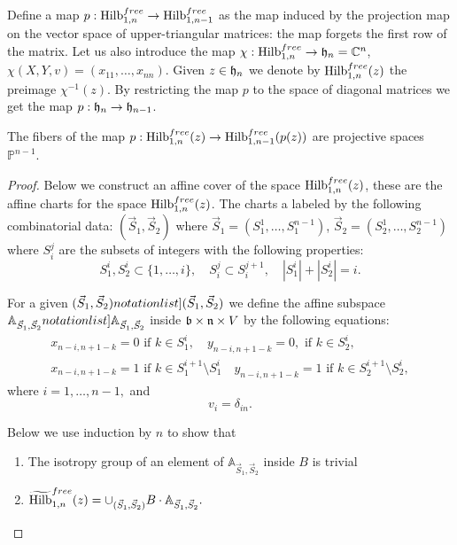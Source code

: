 \documentclass[10pt]{amsart}
\begin{document}
Define a map $p: \mathrm{Hilb}^{free}_{1,n}\to \mathrm{Hilb}^{free}_{1,n-1}$ as the map induced by the projection map on the vector space of upper-triangular matrices: the map
forgets the first row of the matrix. Let us also introduce the map $\chi: \mathrm{Hilb}^{free}_{1,n}\to \mathfrak{h}_n=\mathbb{C}^{n}$, $\chi(X,Y,v)=(x_{11},\dots,x_{nn})$.  Given $z\in \mathfrak{h}_n$ we denote by $\mathrm{Hilb}^{free}_{1,n}(z)$ the preimage
$\chi^{-1}(z)$. By restricting the map $p$ to the space of diagonal matrices we get the map $p:\mathfrak{h}_n\to \mathfrak{h}_{n-1}$.

\begin{proposition}\label{prop: aff cover} The fibers of the map $p: \mathrm{Hilb}^{free}_{1,n}(z)\to \mathrm{Hilb}^{free}_{1,n-1}(p(z))$ are projective spaces $\mathbb{P}^{n-1}$.
\end{proposition}
\begin{proof}
Below we construct an affine cover of the space $\mathrm{Hilb}^{free}_{1,n}(z)$, these are the affine charts for the space $\mathrm{Hilb}^{free}_{1,n}(z)$. The charts a labeled by the following combinatorial data: $(\vec{S}_1,\vec{S}_2)$
where $\vec{S}_1=(S_1^1,\dots,S_1^{n-1})$, $\vec{S}_2=(S_2^1,\dots, S_2^{n-1})$ where $S_i^j$ are the subsets of integers with the following properties:
$$ S_1^i, S_2^i\subset \{1,\dots,i\},\quad S_i^j\subset S_i^{j+1},\quad |S_1^i|+|S_2^i|=i.$$

For a given $\SymbolPrint{(\vec{S}_1,\vec{S}_2)}$ we define the affine subspace $\SymbolPrint{\mathbb{A}_{\vec{S}_1,\vec{S}_2}}$ inside $\mathfrak{b}\times \mathfrak{n}\times V$ by the following equations:
\begin{gather}
x_{n-i, n+1-k}=0 \mbox{ if } k\in S_1^i,\quad y_{n-i,n+1-k}=0,\mbox{ if } k\in S_2^i, \label{eq: slice 1}\\
x_{n-i,n+1-k}=1 \mbox{ if } k \in S_1^{i+1}\setminus S_1^i\quad y_{n-i,n+1-k}=1 \mbox{ if } k \in S_2^{i+1}\setminus S_2^i, \label{eq: slice 2}
\end{gather}
where \( i=1,\dots, n-1,\) and
\begin{equation}
 v_i=\delta_{in}\label{eq: slice 3}.
\end{equation}


Below we use induction by $n$ to show that
\begin{enumerate}
\item The isotropy group of an element of $\mathbb{A}_{\vec{S}_1,\vec{S}_2}$ inside $B$ is trivial
\item $\widetilde{\mathrm{Hilb}}^{free}_{1,n}(z)=\cup_{(\vec{S}_1,\vec{S}_2)} B\cdot \mathbb{A}_{\vec{S}_1,\vec{S}_2}.$
\end{enumerate}


\end{proof}
\end{document}

